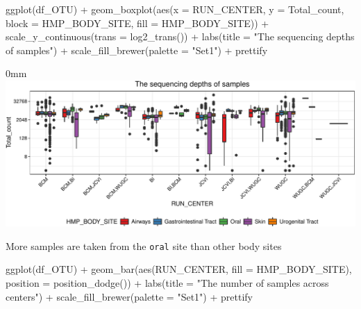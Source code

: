 \documentclass[]{article}
\newcommand{\hlstr}[1]{\textcolor[rgb]{0.251,0.627,0.251}{#1}}%
\newcommand{\hlopt}[1]{\textcolor[rgb]{0,0,0}{#1}}%
\newcommand{\hlstd}[1]{\textcolor[rgb]{0.251,0.251,0.251}{#1}}%
\newcommand{\hlkwc}[1]{\textcolor[rgb]{0.251,0.251,0.251}{#1}}%
\newcommand{\hlkwd}[1]{\textcolor[rgb]{0.878,0.439,0.125}{#1}}%
\newenvironment{Shaded}{\begin{myshaded}}{\end{myshaded}}
\newcommand{\KeywordTok}[1]{\hlkwd{#1}}
\newcommand{\DataTypeTok}[1]{\hlkwc{#1}}
\newcommand{\StringTok}[1]{\hlstr{#1}}
\newcommand{\OperatorTok}[1]{\hlopt{#1}}
\newcommand{\NormalTok}[1]{\hlstd{#1}}
\begin{document}
\begin{Shaded}
\begin{Highlighting}[]
\KeywordTok{ggplot}\NormalTok{(df_OTU) }\OperatorTok{+}
\StringTok{  }\KeywordTok{geom_boxplot}\NormalTok{(}\KeywordTok{aes}\NormalTok{(}\DataTypeTok{x =}\NormalTok{ RUN_CENTER, }\DataTypeTok{y =}\NormalTok{ Total_count,}
                   \DataTypeTok{block =}\NormalTok{ HMP_BODY_SITE, }\DataTypeTok{fill =}\NormalTok{ HMP_BODY_SITE)) }\OperatorTok{+}\StringTok{ }
\StringTok{  }\KeywordTok{scale_y_continuous}\NormalTok{(}\DataTypeTok{trans =} \KeywordTok{log2_trans}\NormalTok{()) }\OperatorTok{+}
\StringTok{  }\KeywordTok{labs}\NormalTok{(}\DataTypeTok{title =} \StringTok{"The sequencing depths of samples"}\NormalTok{) }\OperatorTok{+}
\StringTok{  }\KeywordTok{scale_fill_brewer}\NormalTok{(}\DataTypeTok{palette =} \StringTok{"Set1"}\NormalTok{) }\OperatorTok{+}
\StringTok{  }\NormalTok{prettify }
\end{Highlighting}
\end{Shaded}

\begin{adjustwidth}{\fltoffset}{0mm}
\includegraphics{figure/unnamed-chunk-51-1} \end{adjustwidth}

More samples are taken from the \texttt{oral} site than other body sites

\begin{Shaded}
\begin{Highlighting}[]
\KeywordTok{ggplot}\NormalTok{(df_OTU) }\OperatorTok{+}
\StringTok{  }\KeywordTok{geom_bar}\NormalTok{(}\KeywordTok{aes}\NormalTok{(RUN_CENTER, }\DataTypeTok{fill =}\NormalTok{ HMP_BODY_SITE),}
           \DataTypeTok{position =} \KeywordTok{position_dodge}\NormalTok{()) }\OperatorTok{+}
\StringTok{  }\KeywordTok{labs}\NormalTok{(}\DataTypeTok{title =} \StringTok{"The number of samples across centers"}\NormalTok{) }\OperatorTok{+}
\StringTok{  }\KeywordTok{scale_fill_brewer}\NormalTok{(}\DataTypeTok{palette =} \StringTok{"Set1"}\NormalTok{) }\OperatorTok{+}
\StringTok{  }\NormalTok{prettify }
\end{Highlighting}
\end{Shaded}
\end{document}
